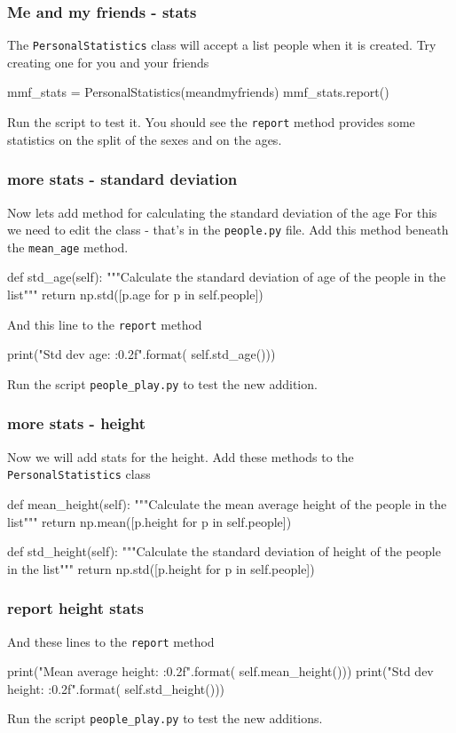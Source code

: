 \documentclass{beamer}
\begin{document}
\begin{frame}[fragile]
\frametitle{Me and my friends - stats}
The \texttt{PersonalStatistics} class will accept a list people when it is created.
Try creating one for you and your friends

\begin{code} 
mmf_stats = PersonalStatistics(meandmyfriends)
mmf_stats.report()
\end{code}
Run the script to test it.
You should see the \texttt{report} method provides some statistics 
on the split of the sexes and on the ages.

\end{frame}

\begin{frame}[fragile]
\frametitle{more stats - standard deviation}
Now lets add method for calculating the standard deviation of the age
For this we need to edit the class - that's in the \texttt{people.py} file.
Add this method beneath the \texttt{mean\_age} method.
\begin{code} 
    def std_age(self):
        """Calculate the standard deviation
         of age of the people in the list"""
        return np.std([p.age for p in self.people])
\end{code}
And this line to the \texttt{report} method
\begin{code} 
        print("Std dev age: {:0.2f}".format(
                                self.std_age()))
\end{code}
Run the script \texttt{people\_play.py} to test the new addition.

\end{frame}

\begin{frame}[fragile]
\frametitle{more stats - height}
Now we will add stats for the height.
Add these methods to the \texttt{PersonalStatistics} class
\begin{code} 
    def mean_height(self):
        """Calculate the mean average height 
        of the people in the list"""
        return np.mean([p.height for p in self.people])
        
    def std_height(self):
        """Calculate the standard deviation of 
        height of the people in the list"""
        return np.std([p.height for p in self.people])
\end{code}

\end{frame}

\begin{frame}[fragile]
\frametitle{report height stats}
And these lines to the \texttt{report} method
\begin{code} 
        print("Mean average height: {:0.2f}".format(
                                  self.mean_height()))
        print("Std dev height: {:0.2f}".format(
                                   self.std_height()))
\end{code}
Run the script \texttt{people\_play.py} to test the new additions.

\end{frame}
\end{document}
